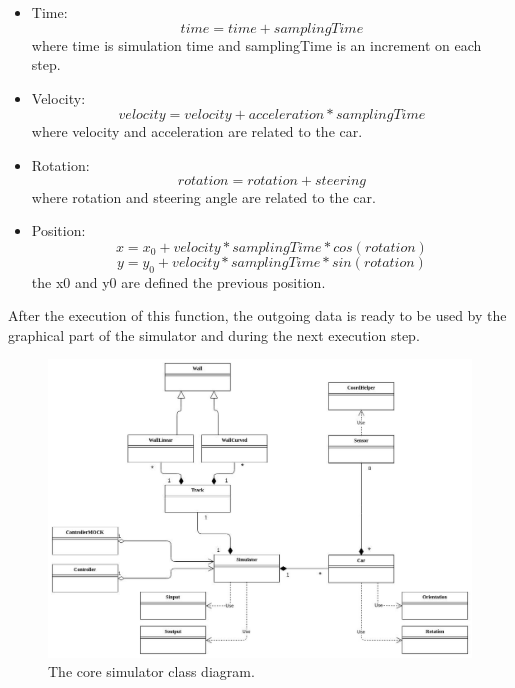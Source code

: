 \begin{itemize}
    \item Time:
        \begin{equation}
            time = time + samplingTime
        \end{equation} \newline
        where time is simulation time and samplingTime is an increment on each step. 
    \item Velocity:
    \begin{equation}
        velocity = velocity + acceleration * samplingTime
    \end{equation} \newline
        where velocity and acceleration are related to the car.
    \item Rotation:
    \begin{equation}
        rotation = rotation + steering
    \end{equation} \newline
        where rotation and steering angle are related to the car.
    \item Position:
    \begin{equation}
        x = x_0 + velocity * samplingTime * cos(rotation)
    \end{equation}
    \begin{equation}
        y = y_0 + velocity * samplingTime * sin(rotation)
    \end{equation} \newline
    the x0 and y0 are defined the previous position.
\end{itemize}
After the execution of this function, the outgoing data is ready to be used by the graphical part of the simulator and during the next execution step. \newline
\begin{figure}[h!]
    \centering
    \includegraphics[width=\linewidth]{src/pic/class-diagram}
    \caption{The core simulator class diagram.}
    \label{fig:class-diagram}
\end{figure}
